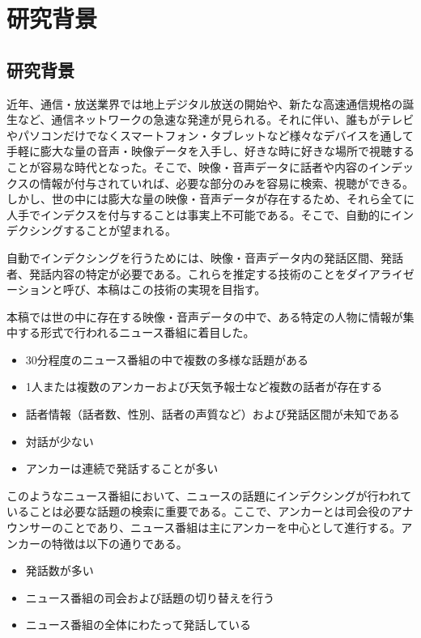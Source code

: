 \chapter{研究背景}

\section{研究背景}
近年、通信・放送業界では地上デジタル放送の開始や、新たな高速通信規格の誕生など、通信ネットワークの急速な発達が見られる。それに伴い、誰もがテレビやパソコンだけでなくスマートフォン・タブレットなど様々なデバイスを通して手軽に膨大な量の音声・映像データを入手し、好きな時に好きな場所で視聴することが容易な時代となった。そこで、映像・音声データに話者や内容のインデックスの情報が付与されていれば、必要な部分のみを容易に検索、視聴ができる。しかし、世の中には膨大な量の映像・音声データが存在するため、それら全てに人手でインデクスを付与することは事実上不可能である。そこで、自動的にインデクシングすることが望まれる。\par
自動でインデクシングを行うためには、映像・音声データ内の発話区間、発話者、発話内容の特定が必要である。これらを推定する技術のことをダイアライゼーションと呼び、本稿はこの技術の実現を目指す。\par
本稿では世の中に存在する映像・音声データの中で、ある特定の人物に情報が集中する形式で行われるニュース番組に着目した。

\vspace{0.2in}
\begin{itemize}
\item 30分程度のニュース番組の中で複数の多様な話題がある
\item 1人または複数のアンカーおよび天気予報士など複数の話者が存在する
\item 話者情報（話者数、性別、話者の声質など）および発話区間が未知である
\item 対話が少ない
\item アンカーは連続で発話することが多い
\end{itemize}

\noindent このようなニュース番組において、ニュースの話題にインデクシングが行われていることは必要な話題の検索に重要である。ここで、アンカーとは司会役のアナウンサーのことであり、ニュース番組は主にアンカーを中心として進行する。アンカーの特徴は以下の通りである。

\vspace{0.2in}
\begin{itemize}
\item 発話数が多い
\item ニュース番組の司会および話題の切り替えを行う
\item ニュース番組の全体にわたって発話している
\end{itemize}

